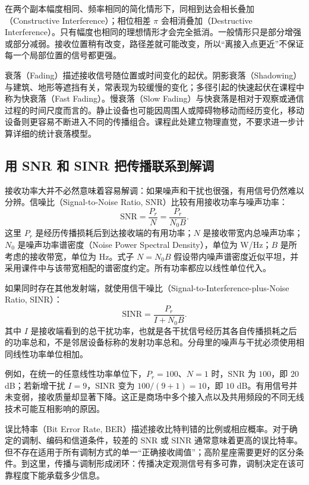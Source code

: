 在两个副本幅度相同、频率相同的简化情形下，同相到达会相长叠加（Constructive Interference）；相位相差 $\pi$ 会相消叠加（Destructive Interference）。只有幅度也相同的理想情形才会完全抵消。一般情形只是部分增强或部分减弱。接收位置稍有改变，路径差就可能改变，所以“离接入点更近”不保证每一个局部位置的信号都更强。

衰落（Fading）描述接收信号随位置或时间变化的起伏。阴影衰落（Shadowing）与建筑、地形等遮挡有关，常表现为较缓慢的变化；多径引起的快速起伏在课程中称为快衰落（Fast Fading）。慢衰落（Slow Fading）与快衰落是相对于观察或通信过程的时间尺度而言的。静止设备也可能因周围人或障碍物移动而经历变化，移动设备则更容易不断进入不同的传播组合。课程此处建立物理直觉，不要求进一步计算详细的统计衰落模型。

\subsection{用 SNR 和 SINR 把传播联系到解调}
接收功率大并不必然意味着容易解调：如果噪声和干扰也很强，有用信号仍然难以分辨。信噪比（Signal-to-Noise Ratio, SNR）比较有用接收功率与噪声功率：
\begin{equation}
\mathrm{SNR}=\frac{P_r}{N}=\frac{P_r}{N_0B}.
\end{equation}
这里 $P_r$ 是经历传播损耗后到达接收端的有用功率；$N$ 是接收带宽内总噪声功率；$N_0$ 是噪声功率谱密度（Noise Power Spectral Density），单位为 W/Hz；$B$ 是所考虑的接收带宽，单位为 Hz。式子 $N=N_0B$ 假设带内噪声谱密度近似平坦，并采用课件中与该带宽相配的谱密度约定。所有功率都应以线性单位代入。

如果同时存在其他发射端，就使用信干噪比（Signal-to-Interference-plus-Noise Ratio, SINR）：
\begin{equation}
\mathrm{SINR}=\frac{P_r}{I+N_0B}.
\end{equation}
其中 $I$ 是接收端看到的总干扰功率，也就是各干扰信号经历其各自传播损耗之后的功率总和，不是邻居设备标称的发射功率总和。分母里的噪声与干扰必须使用相同线性功率单位相加。

例如，在统一的任意线性功率单位下，$P_r=100$、$N=1$ 时，SNR 为 $100$，即 $20$ dB；若新增干扰 $I=9$，SINR 变为 $100/(9+1)=10$，即 $10$ dB。有用信号并未变弱，接收质量却显著下降。这正是商场中多个接入点以及共用频段的不同无线技术可能互相影响的原因。

误比特率（Bit Error Rate, BER）描述接收比特判错的比例或相应概率。对于确定的调制、编码和信道条件，较差的 SNR 或 SINR 通常意味着更高的误比特率。但不存在适用于所有调制方式的单一“正确接收阈值”；高阶星座需要更好的区分条件。到这里，传播与调制形成闭环：传播决定观测信号有多可靠，调制决定在该可靠程度下能承载多少信息。

